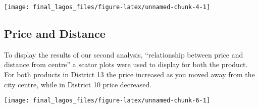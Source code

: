 \documentclass[
  9pt,
]{article}
\begin{document}
\begin{center}\texttt{[image: final\_lagos\_files/figure-latex/unnamed-chunk-4-1]} \end{center}

\hypertarget{price-and-distance}{%
\subsection{Price and Distance}\label{price-and-distance}}

To display the results of our second analysis, ``relationship between
price and distance from centre'' a scator plots were used to display for
both the product. For both products in District 13 the price increased
as you moved away from the city centre, while in District 10 price
decreased.

\begin{center}\texttt{[image: final\_lagos\_files/figure-latex/unnamed-chunk-6-1]} \end{center}
\end{document}
